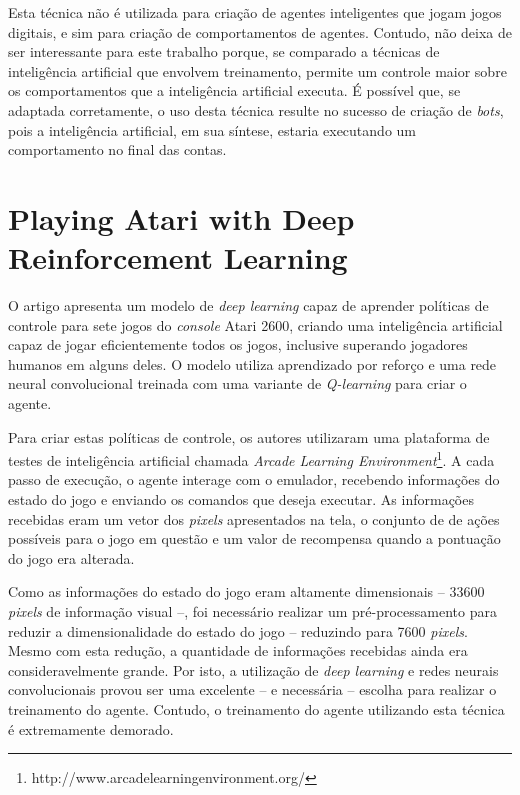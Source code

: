 Esta técnica não é utilizada para criação de agentes inteligentes que jogam
jogos digitais, e sim para criação de comportamentos de agentes. Contudo, não
deixa de ser interessante para este trabalho porque, se comparado a técnicas de
inteligência artificial que envolvem treinamento, permite um controle maior
sobre os comportamentos que a inteligência artificial executa. É possível que,
se adaptada corretamente, o uso desta técnica resulte no sucesso de criação de
\textit{bots}, pois a inteligência artificial, em sua síntese, estaria
executando um comportamento no final das contas.


\section{Playing Atari with Deep Reinforcement Learning}
O artigo apresenta um modelo de \textit{deep learning} capaz de aprender
políticas de controle para sete jogos do \textit{console} Atari 2600, criando
uma inteligência artificial capaz de jogar eficientemente todos os jogos,
inclusive superando jogadores humanos em alguns
deles\cite{DBLP:journals/corr/MnihKSGAWR13}. O modelo utiliza aprendizado por
reforço e uma rede neural convolucional treinada com uma variante de
\textit{Q-learning} para criar o agente.

Para criar estas políticas de controle, os autores utilizaram uma plataforma de
testes de inteligência artificial chamada \textit{Arcade Learning
Environment}\footnote{http://www.arcadelearningenvironment.org/}.  A cada passo
de execução, o agente interage com o emulador, recebendo informações do estado
do jogo e enviando os comandos que deseja executar. As informações recebidas
eram um vetor dos \textit{pixels} apresentados na tela, o conjunto de de ações
possíveis para o jogo em questão e um valor de recompensa quando a pontuação do
jogo era alterada.

Como as informações do estado do jogo eram altamente dimensionais -- 33600
\textit{pixels} de informação visual --, foi necessário realizar um
pré-processamento para reduzir a dimensionalidade do estado do jogo -- reduzindo
para 7600 \textit{pixels}. Mesmo com esta redução, a quantidade de informações
recebidas ainda era consideravelmente grande. Por isto, a utilização de
\textit{deep learning} e redes neurais convolucionais provou ser uma excelente
-- e necessária -- escolha para realizar o treinamento do agente. Contudo, o
treinamento do agente utilizando esta técnica é extremamente demorado.

